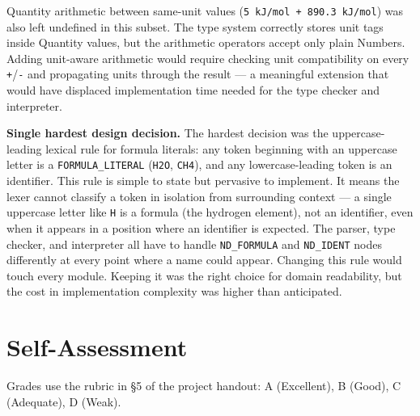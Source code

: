 \documentclass[11pt,a4paper]{article}
\newcommand{\code}[1]{\texttt{#1}}
\begin{document}
Quantity arithmetic between same-unit values (\code{5 kJ/mol + 890.3 kJ/mol}) was also left undefined in this subset. The type system correctly stores unit tags inside Quantity values, but the arithmetic operators accept only plain Numbers. Adding unit-aware arithmetic would require checking unit compatibility on every \code{+}/\code{-} and propagating units through the result --- a meaningful extension that would have displaced implementation time needed for the type checker and interpreter.

\textbf{Single hardest design decision.}\;
The hardest decision was the uppercase-leading lexical rule for formula literals: any token beginning with an uppercase letter is a \code{FORMULA\_LITERAL} (\code{H2O}, \code{CH4}), and any lowercase-leading token is an identifier. This rule is simple to state but pervasive to implement. It means the lexer cannot classify a token in isolation from surrounding context --- a single uppercase letter like \code{H} is a formula (the hydrogen element), not an identifier, even when it appears in a position where an identifier is expected. The parser, type checker, and interpreter all have to handle \code{ND\_FORMULA} and \code{ND\_IDENT} nodes differently at every point where a name could appear. Changing this rule would touch every module. Keeping it was the right choice for domain readability, but the cost in implementation complexity was higher than anticipated.

\section{Self-Assessment}

Grades use the rubric in §5 of the project handout: A (Excellent), B (Good), C (Adequate), D (Weak).
\end{document}
